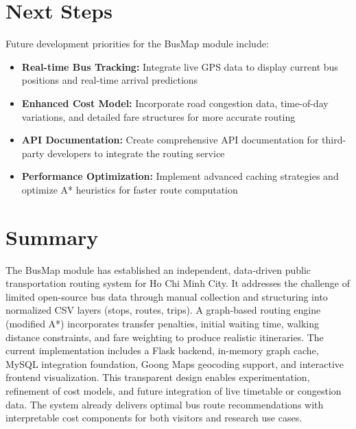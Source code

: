 \section{Next Steps}

Future development priorities for the BusMap module include:

\begin{itemize}
    \item \textbf{Real-time Bus Tracking:} Integrate live GPS data to display current bus positions and real-time arrival predictions
        
    \item \textbf{Enhanced Cost Model:} Incorporate road congestion data, time-of-day variations, and detailed fare structures for more accurate routing
            
        
    \item \textbf{API Documentation:} Create comprehensive API documentation for third-party developers to integrate the routing service
    
    \item \textbf{Performance Optimization:} Implement advanced caching strategies and optimize A* heuristics for faster route computation
\end{itemize}

\section{Summary}

The BusMap module has established an independent, data-driven public transportation routing system for Ho Chi Minh City. It addresses the challenge of limited open-source bus data through manual collection and structuring into normalized CSV layers (stops, routes, trips). A graph-based routing engine (modified A*) incorporates transfer penalties, initial waiting time, walking distance constraints, and fare weighting to produce realistic itineraries. The current implementation includes a Flask backend, in-memory graph cache, MySQL integration foundation, Goong Maps geocoding support, and interactive frontend visualization. This transparent design enables experimentation, refinement of cost models, and future integration of live timetable or congestion data. The system already delivers optimal bus route recommendations with interpretable cost components for both visitors and research use cases.



